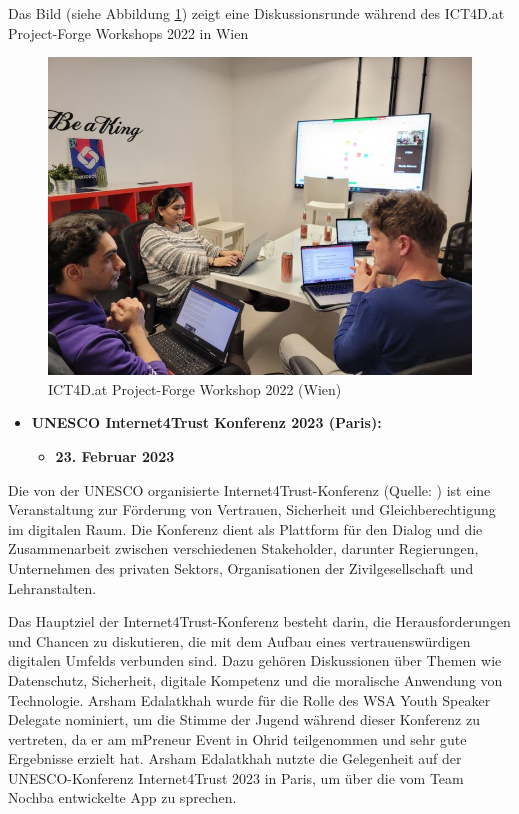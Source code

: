 Das Bild (siehe Abbildung \ref{fig:Project-Forge-Workshop-2022}) zeigt eine Diskussionsrunde während des ICT4D.at Project-Forge Workshops 2022 in Wien

\begin{figure}[H]
    \centering
    \includegraphics[width=1\textwidth]{pics/Project-forge-01.jpg}
    \caption{ICT4D.at Project-Forge Workshop 2022 (Wien)}
    \label{fig:Project-Forge-Workshop-2022}
\end{figure}

\begin{itemize}
    \item \textbf{UNESCO Internet4Trust Konferenz 2023 (Paris):}
          \begin{itemize}
              \item \textbf{23. Februar 2023}
          \end{itemize}
\end{itemize}

Die von der UNESCO organisierte Internet4Trust-Konferenz (Quelle: \cite{unesco-internet-conference-programme} ) ist eine Veranstaltung zur Förderung von Vertrauen, Sicherheit und Gleichberechtigung im digitalen Raum. Die Konferenz dient als Plattform für den Dialog und die Zusammenarbeit zwischen verschiedenen Stakeholder, darunter Regierungen, Unternehmen des privaten Sektors, Organisationen der Zivilgesellschaft und Lehranstalten.

Das Hauptziel der Internet4Trust-Konferenz besteht darin, die Herausforderungen und Chancen zu diskutieren, die mit dem Aufbau eines vertrauenswürdigen digitalen Umfelds verbunden sind. Dazu gehören Diskussionen über Themen wie Datenschutz, Sicherheit, digitale Kompetenz und die moralische Anwendung von Technologie. Arsham Edalatkhah wurde für die Rolle des WSA Youth Speaker Delegate nominiert, um die Stimme der Jugend während dieser Konferenz zu vertreten, da er am mPreneur Event in Ohrid teilgenommen und sehr gute Ergebnisse erzielt hat. Arsham Edalatkhah nutzte die Gelegenheit auf der UNESCO-Konferenz Internet4Trust 2023 in Paris, um über die vom Team Nochba entwickelte App zu sprechen.

